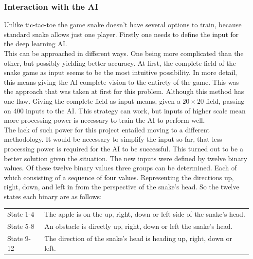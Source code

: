 \documentclass[12pt]{article}
\begin{document}
\subsubsection{Interaction with the AI}
Unlike tic-tac-toe the game snake doesn't have several options to train, because standard snake allows just one player. Firstly one needs to define the input for the \gls{deep learning} \gls{AI}. \\
This can be approached in different ways. One being more complicated than the other, but possibly yielding better accuracy. At first, the complete field of the snake game as input seems to be the most intuitive possibility. In more detail, this means giving the \gls{AI} complete vision to the entirety of the game. This was the approach that was taken at first for this problem. Although this method has one flaw. Giving the complete field as input means, given a $20{\times}20$ field, passing on 400 inputs to the \gls{AI}. This strategy can work, but inputs of higher scale mean more processing power is necessary to train the AI to perform well. \\
The lack of such power for this project entailed moving to a different methodology. It would be necessary to simplify the input so far, that less processing power is required for the AI to be successful. This turned out to be a better solution given the situation. The new inputs were defined by twelve binary values. Of these twelve binary values three groups can be determined. Each of which consisting of a sequence of four values. Representing the directions up, right, down, and left in from the perspective of the snake's head. So the twelve states each binary are as follows:

\begin{table}[ht]
\begin{tabularx}{\textwidth}{lX}
State 1-4 & The apple is on the up, right, down or left side of the snake's head.\\
State 5-8 & An obstacle is directly up, right, down or left the snake's head.\\
State 9-12 & The direction of the snake's head is heading up, right, down or left.\\
\end{tabularx}
\end{table}
\end{document}
